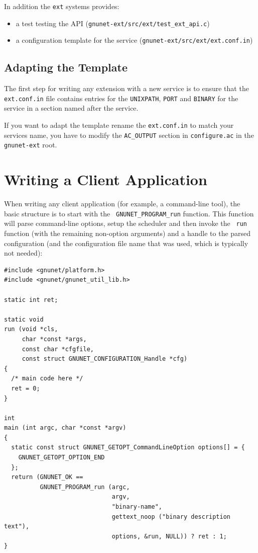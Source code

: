 \documentclass[10pt]{article}
\begin{document}
In addition the \texttt{ext} systems provides:
\begin{itemize}
\itemsep0em
  \item a test testing the API (\lstinline|gnunet-ext/src/ext/test_ext_api.c|)
  \item a configuration template for the service (\lstinline|gnunet-ext/src/ext/ext.conf.in|)
\end{itemize}


\subsection{Adapting the Template}

The first step for writing any extension with a new service is to
ensure that the {\tt ext.conf.in} file contains entries for the
\texttt{UNIXPATH}, \texttt{PORT} and \texttt{BINARY} for the service in a section named after
the service. 

If you want to adapt the template rename the {\tt ext.conf.in} to match your 
services name, you have to modify the \texttt{AC\_OUTPUT} section in {\tt configure.ac} 
in the \texttt{gnunet-ext} root.

\section{Writing a Client Application}

When writing any client application (for example, a command-line
tool), the basic structure is to start with the {\tt
  GNUNET\_PROGRAM\_run} function.  This function will parse
command-line options, setup the scheduler and then invoke the {\tt
  run} function (with the remaining non-option arguments) and a handle
to the parsed configuration (and the configuration file name that was
used, which is typically not needed):

\lstset{language=c}
\begin{lstlisting}
#include <gnunet/platform.h>
#include <gnunet/gnunet_util_lib.h>

static int ret;

static void
run (void *cls,
     char *const *args,
     const char *cfgfile,
     const struct GNUNET_CONFIGURATION_Handle *cfg)
{
  /* main code here */
  ret = 0;
}

int
main (int argc, char *const *argv)
{
  static const struct GNUNET_GETOPT_CommandLineOption options[] = {
    GNUNET_GETOPT_OPTION_END
  };
  return (GNUNET_OK ==
          GNUNET_PROGRAM_run (argc,
                              argv,
                              "binary-name",
                              gettext_noop ("binary description text"),
                              options, &run, NULL)) ? ret : 1;
}
\end{lstlisting}
\end{document}
